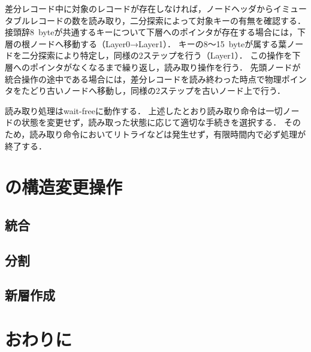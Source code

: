 差分レコード中に対象のレコードが存在しなければ，ノードヘッダからイミュータブルレコードの数を読み取り，二分探索によって対象キーの有無を確認する．
接頭辞8~byteが共通するキーについて下層へのポインタが存在する場合には，下層の根ノードへ移動する（Layer0→Layer1）．
キーの8～15~byteが属する葉ノードを二分探索により特定し，同様の2ステップを行う（Layer1）．
この操作を下層へのポインタがなくなるまで繰り返し，読み取り操作を行う．
先頭ノードが統合操作の途中である場合には，差分レコードを読み終わった時点で物理ポインタをたどり古いノードへ移動し，同様の2ステップを古いノード上で行う．

読み取り処理はwait-freeに動作する．
上述したとおり読み取り命令は一切ノードの状態を変更せず，読み取った状態に応じて適切な手続きを選択する．
そのため，読み取り命令においてリトライなどは発生せず，有限時間内で必ず処理が終了する．

\section{\Bcforest{}の構造変更操作}
\label{sec:smo}

\subsection{統合}
\subsection{分割}
\subsection{新層作成}

\section{おわりに}
\label{sec:conclusion}

